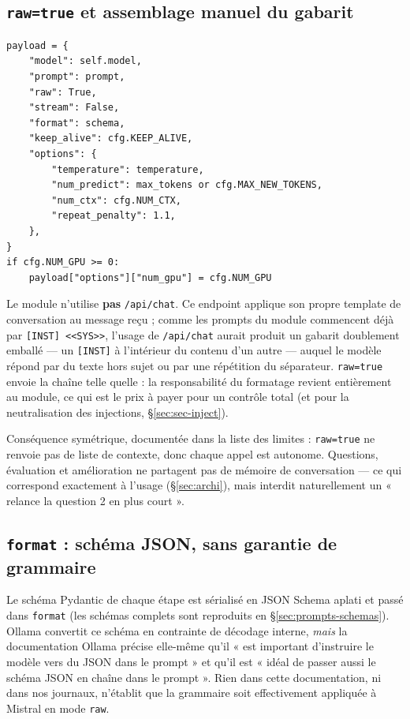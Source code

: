\subsection{\texttt{raw=true} et assemblage manuel du gabarit}
\label{sec:modele-raw}

\begin{lstlisting}[style=adamcode, caption={Payload envoyé à \texttt{/api/generate} (\file{llm\_adam.py}, méthode \texttt{generate\_json}, lignes 145--161) ; \texttt{num\_gpu} n'est ajouté que si \texttt{ADAM\_MISTRAL\_NUM\_GPU} $\geq$ 0.}, label={lst:payload}]
payload = {
    "model": self.model,
    "prompt": prompt,
    "raw": True,
    "stream": False,
    "format": schema,
    "keep_alive": cfg.KEEP_ALIVE,
    "options": {
        "temperature": temperature,
        "num_predict": max_tokens or cfg.MAX_NEW_TOKENS,
        "num_ctx": cfg.NUM_CTX,
        "repeat_penalty": 1.1,
    },
}
if cfg.NUM_GPU >= 0:
    payload["options"]["num_gpu"] = cfg.NUM_GPU
\end{lstlisting}

Le module n'utilise \textbf{pas} \texttt{/api/chat}. Ce endpoint applique son
propre template de conversation au message reçu ; comme les prompts du module
commencent déjà par \verb|[INST] <<SYS>>|, l'usage de \texttt{/api/chat}
aurait produit un gabarit doublement emballé --- un \texttt{[INST]} à
l'intérieur du contenu d'un autre --- auquel le modèle répond par du texte
hors sujet ou par une répétition du séparateur. \texttt{raw=true} envoie la
chaîne telle quelle : la responsabilité du formatage revient entièrement au
module, ce qui est le prix à payer pour un contrôle total (et pour la
neutralisation des injections, §\ref{sec:sec-inject}).

Conséquence symétrique, documentée dans la liste des limites : \texttt{raw=true}
ne renvoie pas de liste de contexte, donc chaque appel est autonome. Questions,
évaluation et amélioration ne partagent pas de mémoire de conversation --- ce
qui correspond exactement à l'usage (§\ref{sec:archi}), mais interdit
naturellement un « relance la question 2 en plus court ».

\subsection{\texttt{format} : schéma JSON, sans garantie de grammaire}
\label{sec:modele-format}

Le schéma Pydantic de chaque étape est sérialisé en JSON Schema aplati et passé
dans \texttt{format} (les schémas complets sont reproduits en
§\ref{sec:prompts-schemas}). Ollama convertit ce schéma en contrainte de décodage
interne, \emph{mais} la documentation Ollama précise elle-même qu'il « est
important d'instruire le modèle vers du JSON dans le prompt » et qu'il est
« idéal de passer aussi le schéma JSON en chaîne dans le prompt ». Rien dans
cette documentation, ni dans nos journaux, n'établit que la grammaire soit
effectivement appliquée à Mistral en mode \texttt{raw}.

